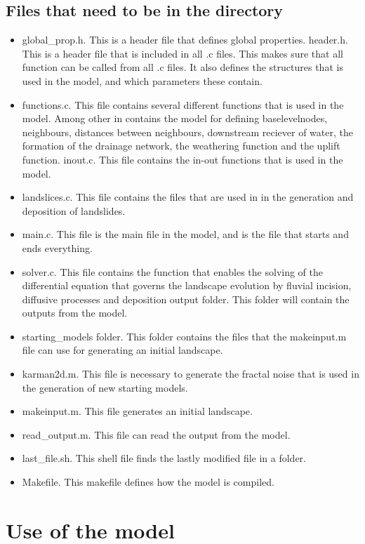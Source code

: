 \documentclass[a4paper,12pt,oneside,article,]{memoir}
\begin{document}
\section{Files that need to be in the directory}
\begin{itemize}
\item
global\_prop.h. This is a header file that defines global properties.
header.h. This is a header file that is included in all .c files. This makes sure that all function can be called from all .c files. It also defines the structures that is used in the model, and which parameters these contain.
\item
functions.c. This file contains several different functions that is used in the model. Among other in contains the model for defining baselevelnodes, neighbours, distances between neighbours, downstream reciever of water, the formation of the drainage network, the weathering function and the uplift function.
inout.c. This file contains the in-out functions that is used in the model.
\item
landslices.c. This file contains the files that are used in in the generation and deposition of landslides. 
\item
main.c. This file is the main file in the model, and is the file that starts and ends everything.
\item
solver.c. This file contains the function that enables the solving of the differential equation that governs the landscape evolution by fluvial incision, diffusive processes and deposition
output folder. This folder will contain the outputs from the model.
\item
starting\_models folder. This folder contains the files that the makeinput.m file can use for generating an initial landscape.
\item
karman2d.m. This file is necessary to generate the fractal noise that is used in the generation of new starting models.
\item
makeinput.m. This file generates an initial landscape.
\item
read\_output.m. This file can read the output from the model.
\item
last\_file.sh. This shell file finds the lastly modified file in a folder.
\item
Makefile. This makefile defines how the model is compiled.
\end{itemize}

\chapter{Use of the model}
\end{document}

